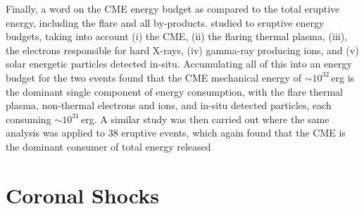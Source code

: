 Finally, a word on the CME energy budget as compared to the total eruptive energy, including the flare and all by-products. \citet{emslie2004} studied to eruptive energy budgets, taking into account (i) the CME, (ii) the flaring thermal plasma, (iii), the electrons responsible for hard X-rays, (iv) gamma-ray producing ions, and (v) solar energetic particles detected in-situ. Accumulating all of this into an energy budget for the two events found that the CME mechanical energy of $\sim10^{32}$\,erg is the dominant single component of energy consumption, with the flare thermal plasma, non-thermal electrons and ions, and in-situ detected particles, each consuming $\sim10^{31}$\,erg. A similar study was then carried out where the same analysis was applied to 38 eruptive events, which again found that the CME is the dominant consumer of total energy released \citep{emslie2012}





\section{Coronal Shocks}\label{sec:21}


